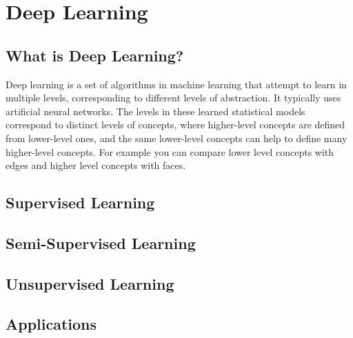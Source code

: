 
\chapter{Deep Learning\authorB}

\section{What is Deep Learning?}

Deep learning is a set of algorithms in machine
learning that attempt to learn in multiple levels, corresponding to different levels of abstraction. It typically uses artificial
neural networks. The levels in these learned statistical models
correspond to distinct levels of concepts, where higher-level concepts are defined from lower-level ones, and the same lower-level concepts can help to define many higher-level concepts. For example you can compare lower level concepts with edges and higher level concepts with faces. 

\section{Supervised Learning}
\section{Semi-Supervised Learning}
\section{Unsupervised Learning}
\section{Applications}

